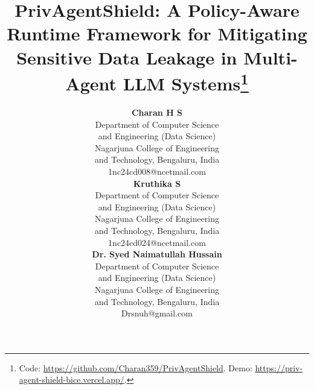 \documentclass[conference]{IEEEtran}
\begin{document}
\title{PrivAgentShield: A Policy-Aware Runtime Framework for Mitigating Sensitive Data Leakage in Multi-Agent LLM Systems\thanks{Code: \url{https://github.com/Charan359/PrivAgentShield}. Demo: \url{https://priv-agent-shield-bice.vercel.app/}.}
}

\author{
\begin{minipage}[t]{0.31\textwidth}
\centering
\textbf{Charan H S}\\
\scriptsize Department of Computer Science\\
and Engineering (Data Science)\\
Nagarjuna College of Engineering\\
and Technology, Bengaluru, India\\
1nc24cd008@ncetmail.com
\end{minipage}%
\hfill
\begin{minipage}[t]{0.31\textwidth}
\centering
\textbf{Kruthika S}\\
\scriptsize Department of Computer Science\\
and Engineering (Data Science)\\
Nagarjuna College of Engineering\\
and Technology, Bengaluru, India\\
1nc24cd024@ncetmail.com
\end{minipage}%
\hfill
\begin{minipage}[t]{0.31\textwidth}
\centering
\textbf{Dr. Syed Naimatullah Hussain}\\
\scriptsize Department of Computer Science\\
and Engineering (Data Science)\\
Nagarjuna College of Engineering\\
and Technology, Bengaluru, India\\
Drsnuh@gmail.com
\end{minipage}

\vspace{0.25cm}

}
\end{document}
